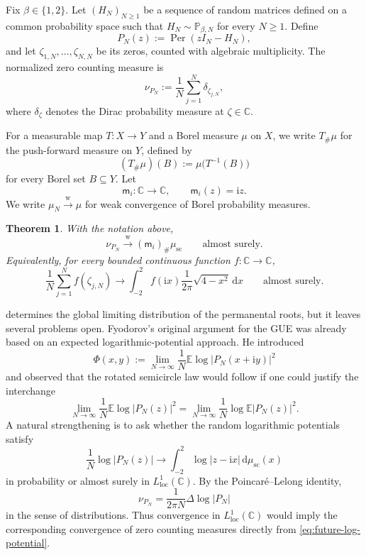 \documentclass[11pt,reqno]{amsart}
\numberwithin{equation}{section}
\newtheorem{theorem}{Theorem}[section]
\theoremstyle{definition}
\theoremstyle{remark}
\DeclareMathOperator{\Per}{Per}
\newcommand{\E}{\mathbb E}
\newcommand{\Pp}{\mathbb P}
\newcommand{\C}{\mathbb C}
\newcommand{\1}{\mathbf 1}
\newcommand{\dd}{\mathrm d}
\newcommand{\ii}{\mathrm i}
\newcommand{\weak}{\xrightarrow{\mathrm w}}
\begin{document}
Fix \(\beta\in\{1,2\}\).  Let \((H_N)_{N\ge1}\) be a sequence of random
matrices defined on a common probability space such that
\(H_N\sim\Pp_{\beta,N}\) for every \(N\ge1\).   Define
\[
  P_N(z):=\Per(zI_N-H_N),
\]
and let \(\zeta_{1,N},\ldots,\zeta_{N,N}\) be its zeros, counted with
algebraic multiplicity.  The normalized zero counting measure is
\[
  \nu_{P_N}:=\frac1N\sum_{j=1}^N\delta_{\zeta_{j,N}},
\]
where \(\delta_\zeta\) denotes the Dirac probability measure at
\(\zeta\in\C\).

For a measurable map \(T:X\to Y\) and a Borel measure \(\mu\) on \(X\), we
write \(T_\#\mu\) for the push-forward measure on \(Y\), defined by
\[
  (T_\#\mu)(B):=\mu\bigl(T^{-1}(B)\bigr)
\]
for every Borel set \(B\subseteq Y\).  Let
\[
  \mathsf m_i:\C\to\C,
  \qquad
  \mathsf m_i(z)=\ii z.
\]
We write \(\mu_N\weak\mu\) for weak convergence of Borel probability
measures.

\begin{theorem}\label{thm:main}
With the notation above,
\[
  \nu_{P_N}
  \weak
  (\mathsf m_i)_\#\mu_{\mathrm{sc}}
  \qquad\text{almost surely.}
\]
Equivalently, for every bounded continuous function \(f:\C\to\C\),
\[
  \frac1N\sum_{j=1}^N f(\zeta_{j,N})
  \to
  \int_{-2}^{2}
  f(\ii x)\frac1{2\pi}\sqrt{4-x^2}\,\dd x
  \qquad\text{almost surely.}
\]
\end{theorem}

 

 determines the global limiting distribution of the
permanental roots, but it leaves several problems open.  Fyodorov's
original argument for the GUE was already based on an expected
logarithmic-potential approach.  He introduced
\[
  \Phi(x,y)
  :=
  \lim_{N\to\infty}\frac1N
  \E\log\bigl|P_N(x+\ii y)\bigr|^2
\]
and observed that the rotated semicircle law would follow if one could
justify the interchange
\cite[Eqs.~(1.17)--(1.20)]{Fyodorov2006}
\[
  \lim_{N\to\infty}\frac1N\E\log|P_N(z)|^2
  =
  \lim_{N\to\infty}\frac1N\log\E|P_N(z)|^2.
\]
 A natural strengthening is to ask whether the random logarithmic potentials
satisfy
\begin{equation}\label{eq:future-log-potential}
  \frac1N\log|P_N(z)|
  \to
  \int_{-2}^{2}\log|z-\ii x|\,\dd\mu_{\mathrm{sc}}(x)
\end{equation}
in probability or almost surely in
\(L^1_{\mathrm{loc}}(\C)\).   By the
Poincar\'e--Lelong identity,
\[
  \nu_{P_N}
  =
  \frac{1}{2\pi N}\Delta\log|P_N|
\]
in the sense of distributions. Thus convergence in \(L^1_{\mathrm{loc}}(\C)\)  would imply the corresponding convergence
of zero counting measures directly from \eqref{eq:future-log-potential}.
\end{document}

